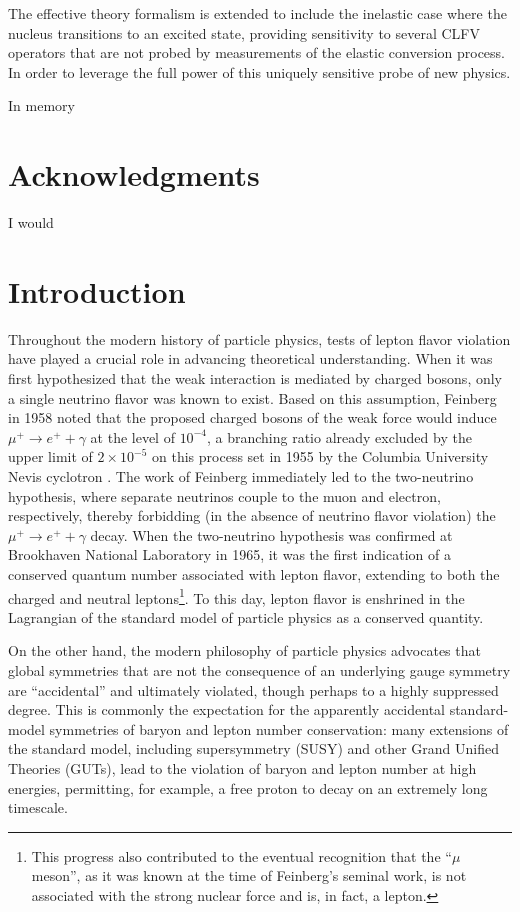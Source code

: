 \documentclass{book}[letterpaper,12pt]
\renewcommand{\headrulewidth}{0pt}
\begin{document}
The effective theory formalism is extended to include the inelastic case where the nucleus transitions to an excited state, providing sensitivity to several CLFV operators that are not probed by measurements of the elastic conversion process. In order to leverage the full power of this uniquely sensitive probe of new physics.

\frontmatter
\vspace*{10cm}
In memory
\tableofcontents
\listoffigures
\listoftables
\chapter*{\centering Acknowledgments}
I would
\mainmatter
\fancyhead[L]{\leftmark}
\chapter{Introduction}
\thispagestyle{headings}
Throughout the modern history of particle physics, tests of lepton flavor violation have played a crucial role in advancing theoretical understanding. When it was first hypothesized that the weak interaction is mediated by charged bosons, only a single neutrino flavor was known to exist. Based on this assumption, Feinberg \cite{PhysRev.110.1482} in 1958 noted that the proposed charged bosons of the weak force would induce $\mu^+\rightarrow e^+ + \gamma$ at the level of $10^{-4}$, a branching ratio already excluded by the upper limit of $2\times 10^{-5}$ on this process set in 1955 by the Columbia University Nevis cyclotron \cite{PhysRev.98.240}. The work of Feinberg immediately led to the two-neutrino hypothesis, where separate neutrinos couple to the muon and electron, respectively, thereby forbidding (in the absence of neutrino flavor violation) the $\mu^+\rightarrow e^+ + \gamma$ decay. When the two-neutrino hypothesis was confirmed at Brookhaven National Laboratory \cite{PhysRevLett.9.36} in 1965, it was the first indication of a conserved quantum number associated with lepton flavor, extending to both the charged and neutral leptons\footnote{This progress also contributed to the eventual recognition that the ``$\mu$ meson'', as it was known at the time of Feinberg's seminal work, is not associated with the strong nuclear force and is, in fact, a lepton.}. To this day, lepton flavor is enshrined in the Lagrangian of the standard model of particle physics as a conserved quantity. 

On the other hand, the modern philosophy of particle physics advocates that global symmetries that are not the consequence of an underlying gauge symmetry are ``accidental'' and ultimately violated, though perhaps to a highly suppressed degree. This is commonly the expectation for the apparently accidental standard-model symmetries of baryon and lepton number conservation: many extensions of the standard model, including supersymmetry (SUSY) and other Grand Unified Theories (GUTs), lead to the violation of baryon and lepton number at high energies, permitting, for example, a free proton to decay on an extremely long timescale. 
\end{document}
